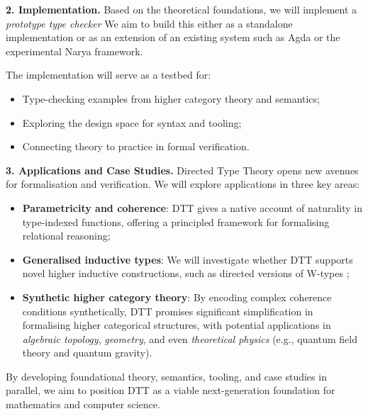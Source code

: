 \documentclass[a4paper,11pt]{article}
\renewcommand{\paragraph}[1]{\textbf{#1.}}
\begin{document}
\paragraph{2. Implementation}
Based on the theoretical foundations, we will implement a
\emph{prototype type checker}
We aim to build this either as a standalone implementation or as an
extension of an existing system such as \textsf{Agda} or the
experimental \textsf{Narya} \cite{Shulman2025Narya} framework.

The implementation will serve as a testbed for:
\begin{itemize}
  \item Type-checking examples from higher category theory and semantics;
  \item Exploring the design space for syntax and tooling;
  \item Connecting theory to practice in formal verification.
\end{itemize}

\paragraph{3. Applications and Case Studies}
Directed Type Theory opens new avenues for formalisation and verification. We will explore applications in three key areas:
\begin{itemize}
  \item \textbf{Parametricity and coherence}: DTT gives a native account of naturality in type-indexed functions, offering a principled framework for formalising relational reasoning;
  \item \textbf{Generalised inductive types}: We will investigate whether DTT supports novel higher inductive constructions, such as directed versions of W-types \cite{altenkirch2024qits};
  \item \textbf{Synthetic higher category theory}: By encoding complex coherence conditions synthetically, DTT promises significant simplification in formalising higher categorical structures, with potential applications in \emph{algebraic topology}, \emph{geometry}, and even \emph{theoretical physics} (e.g., quantum field theory and quantum gravity).
\end{itemize}

By developing foundational theory, semantics, tooling, and case studies in parallel, we aim to position DTT as a viable next-generation foundation for mathematics and computer science.
\end{document}
